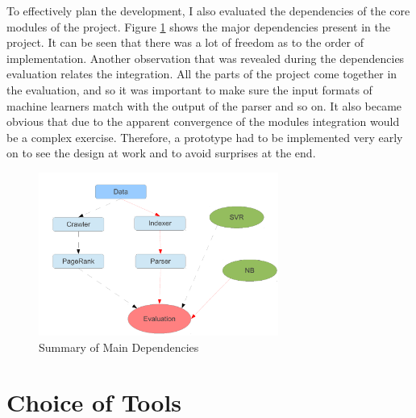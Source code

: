 \documentclass[12pt,notitlepage,twoside]{scrreprt}
\begin{document}
To effectively plan the development, I also evaluated the dependencies of the core modules
of the project. Figure \ref{dep} shows the major dependencies present in the project. It
can be seen that there was a lot of freedom as to the order of implementation. Another
observation that was revealed during the dependencies evaluation relates the integration.
All the parts of the project come together in the evaluation, and so it was important to
make sure the input formats of machine learners match with the output of the parser and so
on. It also became obvious that due to the apparent convergence of the modules integration
would be a complex exercise. Therefore, a prototype had to be implemented very early on to
see the design at work and to avoid surprises at the end.
\begin{figure}[h!]
	\centering
	\includegraphics[width=0.7\textwidth]{figs/dep.pdf}
	\caption{Summary of Main Dependencies\label{dep}}
\end{figure}

\section{Choice of Tools}
\end{document}
